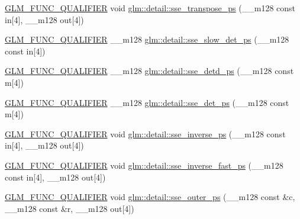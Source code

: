 \begin{DoxyCompactItemize}
\item 
\hyperlink{setup_8hpp_a33fdea6f91c5f834105f7415e2a64407}{G\+L\+M\+\_\+\+F\+U\+N\+C\+\_\+\+Q\+U\+A\+L\+I\+F\+I\+ER} void \hyperlink{namespaceglm_1_1detail_a9c1788ba2d36dd9f1032d6a4a81c53aa}{glm\+::detail\+::sse\+\_\+transpose\+\_\+ps} (\+\_\+\+\_\+m128 const in\mbox{[}4\mbox{]}, \+\_\+\+\_\+m128 out\mbox{[}4\mbox{]})
\item 
\hyperlink{setup_8hpp_a33fdea6f91c5f834105f7415e2a64407}{G\+L\+M\+\_\+\+F\+U\+N\+C\+\_\+\+Q\+U\+A\+L\+I\+F\+I\+ER} \+\_\+\+\_\+m128 \hyperlink{namespaceglm_1_1detail_abc5bda0f2833bc94dfab5145d6a007fc}{glm\+::detail\+::sse\+\_\+slow\+\_\+det\+\_\+ps} (\+\_\+\+\_\+m128 const in\mbox{[}4\mbox{]})
\item 
\hyperlink{setup_8hpp_a33fdea6f91c5f834105f7415e2a64407}{G\+L\+M\+\_\+\+F\+U\+N\+C\+\_\+\+Q\+U\+A\+L\+I\+F\+I\+ER} \+\_\+\+\_\+m128 \hyperlink{namespaceglm_1_1detail_a420b8e8f0dac63e44e5f5894610a31b9}{glm\+::detail\+::sse\+\_\+detd\+\_\+ps} (\+\_\+\+\_\+m128 const m\mbox{[}4\mbox{]})
\item 
\hyperlink{setup_8hpp_a33fdea6f91c5f834105f7415e2a64407}{G\+L\+M\+\_\+\+F\+U\+N\+C\+\_\+\+Q\+U\+A\+L\+I\+F\+I\+ER} \+\_\+\+\_\+m128 \hyperlink{namespaceglm_1_1detail_a8b341355d0f541ced7c324ada9d6d681}{glm\+::detail\+::sse\+\_\+det\+\_\+ps} (\+\_\+\+\_\+m128 const m\mbox{[}4\mbox{]})
\item 
\hyperlink{setup_8hpp_a33fdea6f91c5f834105f7415e2a64407}{G\+L\+M\+\_\+\+F\+U\+N\+C\+\_\+\+Q\+U\+A\+L\+I\+F\+I\+ER} void \hyperlink{namespaceglm_1_1detail_a9691988fe228ada0f1a25704bdcb7da0}{glm\+::detail\+::sse\+\_\+inverse\+\_\+ps} (\+\_\+\+\_\+m128 const in\mbox{[}4\mbox{]}, \+\_\+\+\_\+m128 out\mbox{[}4\mbox{]})
\item 
\hyperlink{setup_8hpp_a33fdea6f91c5f834105f7415e2a64407}{G\+L\+M\+\_\+\+F\+U\+N\+C\+\_\+\+Q\+U\+A\+L\+I\+F\+I\+ER} void \hyperlink{namespaceglm_1_1detail_aa4b602deb0cf1a162dbbb9c3ea64da12}{glm\+::detail\+::sse\+\_\+inverse\+\_\+fast\+\_\+ps} (\+\_\+\+\_\+m128 const in\mbox{[}4\mbox{]}, \+\_\+\+\_\+m128 out\mbox{[}4\mbox{]})
\item 
\hyperlink{setup_8hpp_a33fdea6f91c5f834105f7415e2a64407}{G\+L\+M\+\_\+\+F\+U\+N\+C\+\_\+\+Q\+U\+A\+L\+I\+F\+I\+ER} void \hyperlink{namespaceglm_1_1detail_a81f67ca76f3636c99ea433a12de85b56}{glm\+::detail\+::sse\+\_\+outer\+\_\+ps} (\+\_\+\+\_\+m128 const \&c, \+\_\+\+\_\+m128 const \&r, \+\_\+\+\_\+m128 out\mbox{[}4\mbox{]})
\end{DoxyCompactItemize}
